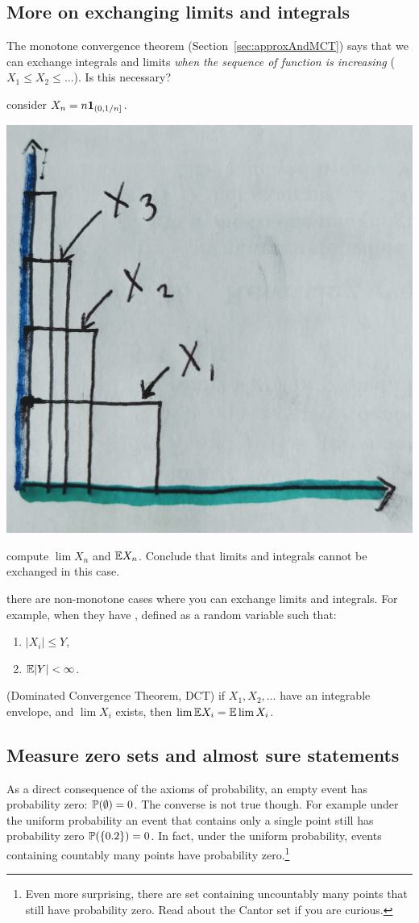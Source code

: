 \documentclass{article}
\begin{document}
\subsection{More on exchanging limits and integrals}

The monotone convergence theorem (Section~\ref{sec:approxAndMCT}) says that we can exchange integrals and limits \emph{when the sequence of function is increasing} ($X_1 \le X_2 \le \dots$). Is this necessary?

 consider $X_n = n \1_{(0, 1/n]}$. 
\begin{center}
	\includegraphics[width=0.4\linewidth]{figures/limit-exchange-warn}
\end{center}

 compute $\lim X_n$ and $\E X_n$. Conclude that limits and integrals cannot be exchanged in this case.

 there are non-monotone cases where you can exchange limits and integrals. For example, when they have , defined as a random variable such that:
\begin{enumerate}
  \item $|X_i| \le Y$,
  \item $\E|Y| < \infty$.
\end{enumerate}

 (Dominated Convergence Theorem, DCT) if $X_1, X_2, \dots$ have an integrable envelope, and $\lim X_i$ exists, then $\lim \E X_i = \E \lim X_i$.


\subsection{Measure zero sets and almost sure statements}

As a direct consequence of the axioms of probability, an empty event has probability zero: $\P(\emptyset) = 0$. The converse is not true though. For example under the uniform probability an event that contains only a single point still has probability zero $\P(\{0.2\}) = 0$. In fact, under the uniform probability, events containing countably many points have probability zero.\footnote{Even more surprising, there are set containing uncountably many points that still have probability zero. Read about the Cantor set if you are curious.} 
\end{document}

